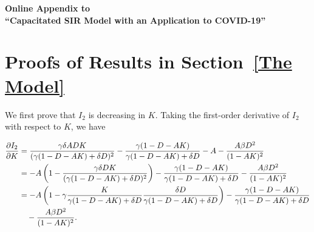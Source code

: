 \documentclass[nonblindrev, copyedit]{informs3a}
\newcounter{prop}[chapter]
\begin{document}
\setcounter{section}{0}
\setcounter{equation}{0}
\setcounter{table}{0}
\setcounter{figure}{0}
\setcounter{definition}{0}
\setcounter{lemma}{0}
\setcounter{proposition}{0}
\setcounter{theorem}{0}
\setcounter{corollary}{0}
\setcounter{footnote}{0}


\begin{center}
	{\textbf{\large Online Appendix to\\
	``Capacitated SIR Model with an Application to COVID-19''}}
\end{center}
\section{Proofs of Results in Section~\ref{The Model}}
\label{Appendix Proofs of technical results}


We first prove that $I_2$ is decreasing in $K$. Taking the first-order derivative of $I_2$ with respect to $K$, we have

\begin{align}
\frac{\partial I_2}{\partial K}&=\frac{\gamma\delta  ADK}{(\gamma(1-D-AK)+\delta D)^2}-\frac{\gamma(1-D-AK)}{\gamma(1-D-AK)+\delta D}-A-\frac{A\beta D^2}{(1-AK)^2}\notag\\
&=-A\left(1-\frac{\gamma\delta DK}{(\gamma(1-D-AK)+\delta D)^2}\right)-\frac{\gamma(1-D-AK)}{\gamma(1-D-AK)+\delta D}-\frac{A\beta D^2}{(1-AK)^2}\notag\\
&=-A\left(1-\gamma\frac{K}{\gamma(1-D-AK)+\delta D}\frac{\delta D}{\gamma(1-D-AK)+\delta D}\right)-\frac{\gamma(1-D-AK)}{\gamma(1-D-AK)+\delta D}\notag\\
&\ \ \ -\frac{A\beta D^2}{(1-AK)^2}.\label{eq:i2K}
\end{align}
\end{document}
